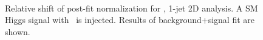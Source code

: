 \begin{figure}[!hbtp]
{}
\\
\caption{Relative shift of post-fit normalization for  \GeV, 1-jet 2D analysis.
A SM Higgs signal with  \GeV\ is injected. Results of background+signal fit are shown.}
\label{fig:norm_inj200_1j_125_sfit}
\end{figure}

\clearpage
